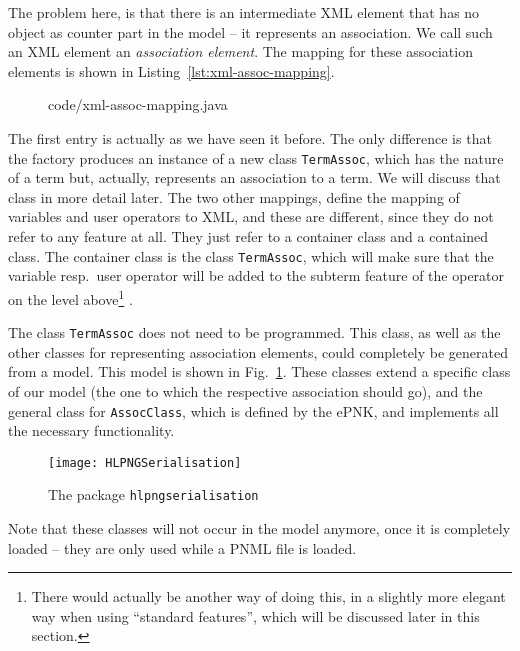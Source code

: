The problem here, is that there is an intermediate XML element that has no
object as counter part in the model -- it represents an association. We call
such an XML element an \emph{association element}.%
The mapping for these association elements is shown in
Listing~\ref{lst:xml-assoc-mapping}.
%
\begin{figure}[htbp!]
%
{code/xml-assoc-mapping.java}
\end{figure}
%
The first entry is actually as we have seen it before. The only difference
is that the factory produces an instance of a new class
{\tt TermAssoc}, which has the nature of a term but, actually, represents
an association to a term. We will discuss that class in more
detail later. The two other mappings, define the mapping of variables
and user operators to XML, and these are different, since they do not
refer to any feature at all. They just refer to a container class and 
a contained class. The container class is the class {\tt TermAssoc},
which will make sure that the variable resp.\ user operator will be added
to the subterm feature of the operator on the level above\footnote
  {There would actually be another way of doing this, in a slightly more
   elegant way when using ``standard features'', which
   will be discussed later in this section.}%
.

The class {\tt TermAssoc} does not need to be programmed. This class,
as well as the other classes for representing association elements, could
completely be generated from a model. This model is shown in Fig.~\ref{fig:AssocClasses}.
These classes extend a specific class of our model (the one to which the
respective association should go), and the general class for {\tt AssocClass},
which is defined by the ePNK, and implements all the necessary functionality.
%
\begin{figure}[btp!!]%
  \centerline{\texttt{[image: HLPNGSerialisation]}}
  \caption{The package {\tt hlpngserialisation}}
  \label{fig:AssocClasses}
\end{figure}
%
Note that these classes will not occur in the model anymore, once it is
completely loaded -- they are only used while a PNML file is loaded.

